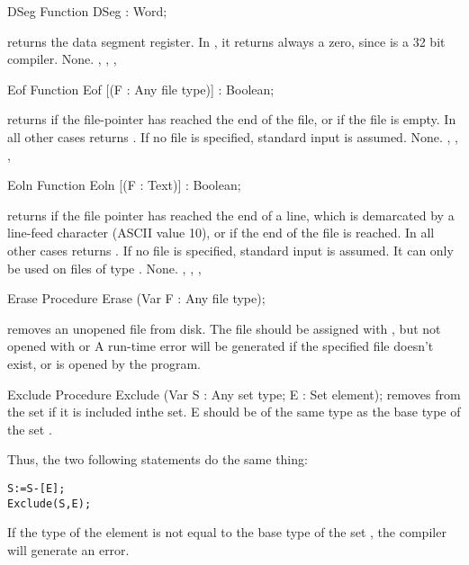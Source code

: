 
\begin{function}{DSeg}
\Declaration
Function DSeg  : Word;

\Description
{} returns the data segment register. In \fpc, it returns always a
zero, since \fpc is a 32 bit compiler.
\Errors
None.
\SeeAlso
{}, , , 
\end{function}


\begin{function}{Eof}
\Declaration
Function Eof [(F : Any file type)] : Boolean;

\Description
{} returns  if the file-pointer has reached the end of the
file, or if the file is empty. In all other cases  returns
.
If no file  is specified, standard input is assumed.
\Errors
None.
\SeeAlso
{}, , , 
\end{function}


\begin{function}{Eoln}
\Declaration
Function Eoln [(F : Text)] : Boolean;

\Description
{} returns  if the file pointer has reached the end of a
line, which is demarcated by a line-feed character (ASCII value 10), or if
the end of the file is reached.
In all other cases  returns .
If no file  is specified, standard input is assumed.
It can only be used on files of type .
\Errors
None.
\SeeAlso
{}, , , 
\end{function}


\begin{procedure}{Erase}
\Declaration
Procedure Erase (Var F : Any file type);

\Description
{} removes an unopened file from disk. The file should be
assigned with , but not opened with  or 
\Errors
A run-time error will be generated if the specified file doesn't exist, or
is opened by the program.
\SeeAlso
{}
\end{procedure}


\begin{procedure}{Exclude}
\Declaration
Procedure Exclude (Var S : Any set type; E : Set element);
\Description
{} removes  from the set  if it is
included inthe set. E should be of the same type as the base type
of the set .

Thus, the two following statements do the same thing:
\begin{verbatim}
S:=S-[E];
Exclude(S,E);
\end{verbatim}
\Errors
If the type of the element  is not equal to the base type of the
set , the compiler will generate an error.
\SeeAlso
{}
\end{procedure}

